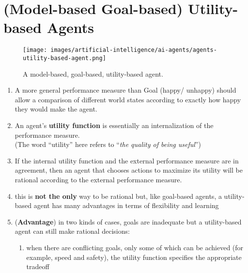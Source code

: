 \section{(Model-based Goal-based) Utility-based Agents}


\begin{figure}[H]
    \centering
    \texttt{[image: images/artificial-intelligence/ai-agents/agents-utility-based-agent.png]}
    \caption*{A model-based, goal-based, utility-based agent. \cite{common/online/tools/draw.io}}
\end{figure}

\hspace{0.5cm}

\begin{enumerate}[itemsep=0.2cm]
    \item A more general performance measure than Goal (happy/ unhappy) should allow a comparison of different world states according to exactly how happy they would make the agent.
    \hfill \cite{ai/book/Artificial-Intelligence-A-Modern-Approach/Russell-Norvig}

    \item An agent’s \textbf{utility function} is essentially an internalization of the performance measure. 
    \hfill \cite{ai/book/Artificial-Intelligence-A-Modern-Approach/Russell-Norvig}
    \\
    (The word “utility” here refers to “\textit{the quality of being useful}”)

    \item  If the internal utility function and the external performance measure are in agreement, then an agent that chooses actions to maximize its utility will be rational according to the external performance measure.
    \hfill \cite{ai/book/Artificial-Intelligence-A-Modern-Approach/Russell-Norvig}

    \item this is \textbf{not the only} way to be rational but, like goal-based agents, a utility-based agent has many advantages in terms of flexibility and learning
    \hfill \cite{ai/book/Artificial-Intelligence-A-Modern-Approach/Russell-Norvig}

    \item (\textbf{Advantage}) in two kinds of cases, goals are inadequate but a utility-based agent can still make rational decisions:
    \begin{enumerate}
        \item when there are conflicting goals, only some of which can be achieved (for example, speed and safety), the utility function specifies the appropriate tradeoff
        \hfill \cite{ai/book/Artificial-Intelligence-A-Modern-Approach/Russell-Norvig}


\end{enumerate}
\end{enumerate}

